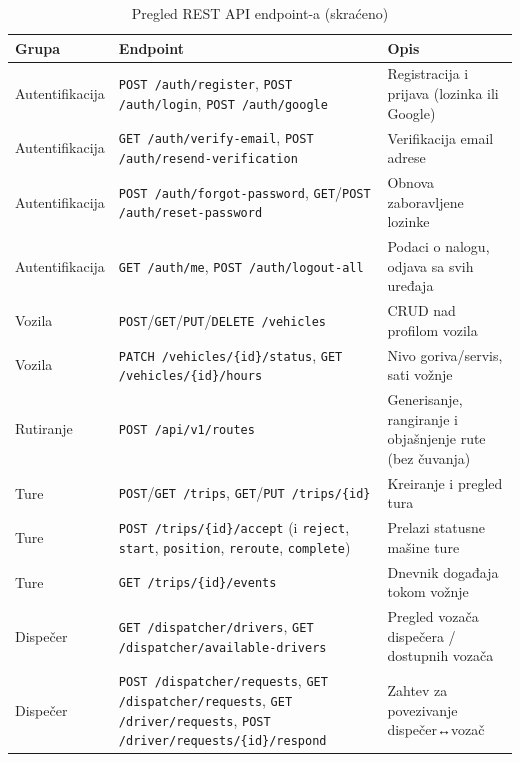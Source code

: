 \begin{longtable}{@{}|>{\small\raggedright\arraybackslash}p{}|>{\small\raggedright\arraybackslash}p{}|>{\small\raggedright\arraybackslash}p{}|@{}}
\caption{Pregled REST API endpoint-a (skraćeno)}\label{tab:7-1}\\
\hline
\rowcolor{black!12}
\textbf{Grupa} & \textbf{Endpoint} & \textbf{Opis} \\
\hline
\endhead
Autentifikacija & \texttt{POST /auth/\allowbreak register}, \texttt{POST /auth/\allowbreak login}, \texttt{POST /auth/\allowbreak google} & Registracija i prijava (lozinka ili Google) \\
\hline
Autentifikacija & \texttt{GET /auth/\allowbreak verify-\allowbreak email}, \texttt{POST /auth/\allowbreak resend-\allowbreak verification} & Verifikacija email adrese \\
\hline
Autentifikacija & \texttt{POST /auth/\allowbreak forgot-\allowbreak password}, \texttt{GET}/\texttt{POST /auth/\allowbreak reset-\allowbreak password} & Obnova zaboravljene lozinke \\
\hline
Autentifikacija & \texttt{GET /auth/me}, \texttt{POST /auth/\allowbreak logout-all} & Podaci o nalogu, odjava sa svih uređaja \\
\hline
Vozila & \texttt{POST}/\texttt{GET}/\texttt{PUT}/\texttt{DELETE /vehicles} & CRUD nad profilom vozila \\
\hline
Vozila & \texttt{PATCH /vehicles/\allowbreak \{id\}/status}, \texttt{GET /vehicles/\allowbreak \{id\}/hours} & Nivo goriva/servis, sati vožnje \\
\hline
Rutiranje & \texttt{POST /api/v1/routes} & Generisanje, rangiranje i objašnjenje rute (bez čuvanja) \\
\hline
Ture & \texttt{POST}/\texttt{GET /trips}, \texttt{GET}/\texttt{PUT /trips/\{id\}} & Kreiranje i pregled tura \\
\hline
Ture & \texttt{POST /trips/\allowbreak \{id\}/accept} (i \texttt{reject}, \texttt{start}, \texttt{position}, \texttt{reroute}, \texttt{complete}) & Prelazi statusne mašine ture \\
\hline
Ture & \texttt{GET /trips/\{id\}/events} & Dnevnik događaja tokom vožnje \\
\hline
Dispečer & \texttt{GET /dispatcher/\allowbreak drivers}, \texttt{GET /dispatcher/\allowbreak available-\allowbreak drivers} & Pregled vozača dispečera / dostupnih vozača \\
\hline
Dispečer & \texttt{POST /dispatcher/\allowbreak requests}, \texttt{GET /dispatcher/\allowbreak requests}, \texttt{GET /driver/\allowbreak requests}, \texttt{POST /driver/\allowbreak requests/\allowbreak \{id\}/respond} & Zahtev za povezivanje dispečer↔vozač \\

\end{longtable}
